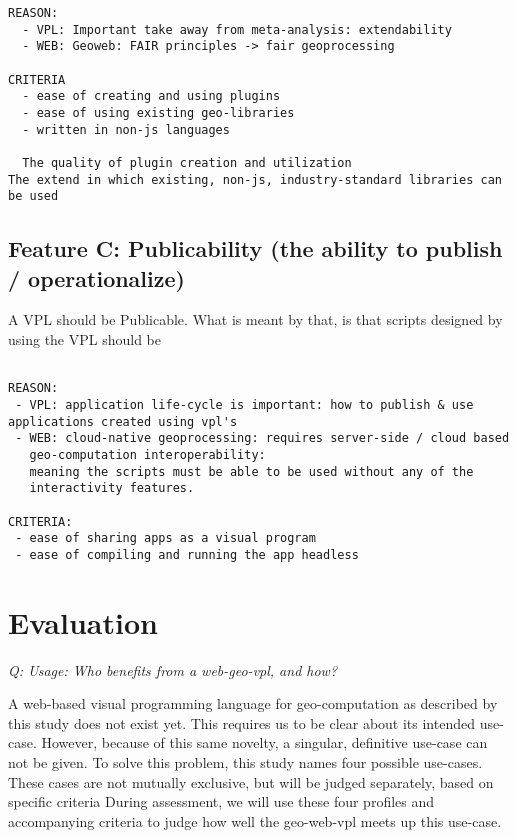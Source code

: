 \begin{lstlisting}
REASON: 
  - VPL: Important take away from meta-analysis: extendability
  - WEB: Geoweb: FAIR principles -> fair geoprocessing

CRITERIA
  - ease of creating and using plugins 
  - ease of using existing geo-libraries 
  - written in non-js languages

  The quality of plugin creation and utilization
The extend in which existing, non-js, industry-standard libraries can be used

\end{lstlisting}



\subsection*{Feature C: Publicability (the ability to publish / operationalize) } 

A VPL should be Publicable. What is meant by that, is that scripts designed by using the VPL should be 

\begin{lstlisting}

REASON: 
 - VPL: application life-cycle is important: how to publish & use applications created using vpl's
 - WEB: cloud-native geoprocessing: requires server-side / cloud based
   geo-computation interoperability: 
   meaning the scripts must be able to be used without any of the 
   interactivity features.

CRITERIA:
 - ease of sharing apps as a visual program
 - ease of compiling and running the app headless
\end{lstlisting}



\section{Evaluation}

\emph{Q: Usage: Who benefits from a web-geo-vpl, and how?  }

A web-based visual programming language for geo-computation as described by this study does not exist yet. 
This requires us to be clear about its intended use-case. 
However, because of this same novelty, a singular, definitive use-case can not be given.
To solve this problem, this study names four possible use-cases.  
These cases are not mutually exclusive, but will be judged separately, based on specific criteria 
During assessment, we will use these four profiles and accompanying criteria to judge how well the geo-web-vpl meets up this use-case.

